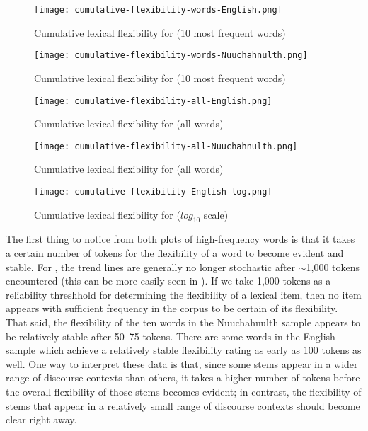\begin{figure}[h!]
  \centering
  \caption{Cumulative lexical flexibility for  (10 most frequent words)}
  \label{fig:cumulative-flexibility-words-English}
  \texttt{[image: cumulative-flexibility-words-English.png]}
\end{figure}

\begin{figure}[h!]
  \centering
  \caption{Cumulative lexical flexibility for  (10 most frequent words)}
  \label{fig:cumulative-flexibility-words-Nuuchahnulth}
  \texttt{[image: cumulative-flexibility-words-Nuuchahnulth.png]}
\end{figure}

\begin{figure}[h!]
  \centering
  \caption{Cumulative lexical flexibility for  (all words)}
  \label{fig:cumulative-flexibility-all-English}
  \texttt{[image: cumulative-flexibility-all-English.png]}
\end{figure}

\begin{figure}[h!]
  \centering
  \caption{Cumulative lexical flexibility for  (all words)}
  \label{fig:cumulative-flexibility-all-Nuuchahnulth}
  \texttt{[image: cumulative-flexibility-all-Nuuchahnulth.png]}
\end{figure}

\begin{figure}[h!]
  \centering
  \caption{Cumulative lexical flexibility for  ($log_10$ scale)}
  \label{fig:cumulative-flexibility-English-log}
  \texttt{[image: cumulative-flexibility-English-log.png]}
\end{figure}

The first thing to notice from both plots of high-frequency words is that it takes a certain number of tokens for the flexibility of a word to become evident and stable. For , the trend lines are generally no longer stochastic after $\sim$1,000 tokens encountered (this can be more easily seen in ). If we take 1,000 tokens as a reliability threshhold for determining the flexibility of a lexical item, then no  item appears with sufficient frequency in the corpus to be certain of its flexibility. That said, the flexibility of the ten words in the Nuuchahnulth sample appears to be relatively stable after 50–75 tokens. There are some words in the English sample which achieve a relatively stable flexibility rating as early as 100 tokens as well. One way to interpret these data is that, since some stems appear in a wider range of discourse contexts than others, it takes a higher number of tokens before the overall flexibility of those stems becomes evident; in contrast, the flexibility of stems that appear in a relatively small range of discourse contexts should become clear right away.

